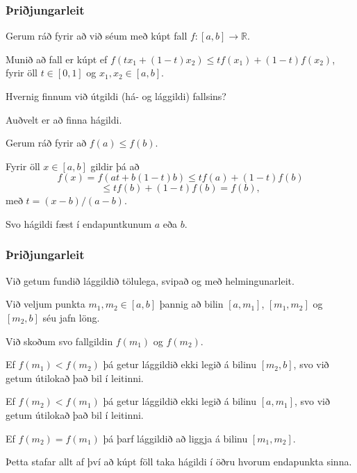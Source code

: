 {
	{
		\frametitle{Þriðjungarleit}
		\item<1-> Gerum ráð fyrir að við séum með kúpt fall $f \colon [a, b] \rightarrow \mathbb{R}$.
		\item<2-> Munið að fall er kúpt ef $f(tx_1 + (1 - t)x_2) \leq tf(x_1) + (1 - t)f(x_2)$, fyrir öll $t \in [0, 1]$ og $x_1, x_2 \in [a, b]$.
		\item<3-> Hvernig finnum við útgildi (há- og lággildi) fallsins?
		\item<4-> Auðvelt er að finna hágildi.
		\item<5-> Gerum ráð fyrir að $f(a) \leq f(b)$.
		\item<6-> Fyrir öll $x \in [a, b]$ gildir þá að
		\[
			f(x) = f(at + b(1 - t)b) \leq tf(a) + (1 - t)f(b)
		\]
		\[
			\leq tf(b) + (1 - t)f(b) = f(b),
		\]
		með $t = (x - b)/(a - b)$.
		\item<7-> Svo hágildi fæst í endapuntkunum $a$ eða $b$.
	}
}

{
	{
		\frametitle{Þriðjungarleit}
		\item<1-> Við getum fundið lággildið tölulega, svipað og með helmingunarleit.
		\item<2-> Við veljum punkta $m_1, m_2 \in [a, b]$ þannig að bilin $[a, m_1]$, $[m_1, m_2]$ og $[m_2, b]$ séu jafn löng.
		\item<3-> Við skoðum svo fallgildin $f(m_1)$ og $f(m_2)$.
		\item<4-> Ef $f(m_1) < f(m_2)$ þá getur lággildið ekki legið á bilinu $[m_2, b]$, svo við getum útilokað það bil í leitinni.
		\item<5-> Ef $f(m_2) < f(m_1)$ þá getur lággildið ekki legið á bilinu $[a, m_1]$, svo við getum útilokað það bil í leitinni.
		\item<6-> Ef $f(m_2) = f(m_1)$ þá þarf lággildið að liggja á bilinu $[m_1, m_2]$.
		\item<7-> Þetta stafar allt af því að kúpt föll taka hágildi í öðru hvorum endapunkta sinna.
	}
}

